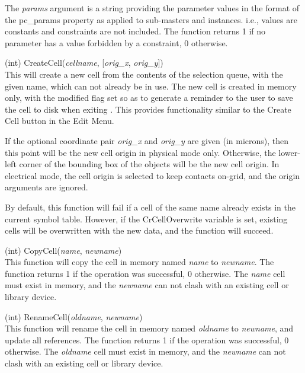 \begin{description}
The {\it params} argument is a string providing the parameter values
in the format of the {\et pc\_params} property as applied to
sub-masters and instances.  i.e., values are constants and constraints
are not included.  The function returns 1 if no parameter has a value
forbidden by a constraint, 0 otherwise.

\item{(int) \vt CreateCell({\it cellname\/}, [{\it orig\_x\/},
  {\it orig\_y\/}])}\\
This will create a new cell from the contents of the selection
queue, with the given name, which can not already be in use.  The new
cell is created in memory only, with the modified flag set so as to
generate a reminder to the user to save the cell to disk when exiting
{\Xic}.  This provides functionality similar to the {\cb Create Cell}
button in the {\cb Edit Menu}.

If the optional coordinate pair {\it orig\_x} and {\it orig\_y} are
given (in microns), then this point will be the new cell origin in
physical mode only.  Otherwise, the lower-left corner of the bounding
box of the objects will be the new cell origin.  In electrical mode,
the cell origin is selected to keep contacts on-grid, and the origin
arguments are ignored.

By default, this function will fail if a cell of the same name already
exists in the current symbol table.  However, if the {\et
CrCellOverwrite} variable is set, existing cells will be overwritten
with the new data, and the function will succeed.

\item{(int) \vt CopyCell({\it name\/}, {\it newname\/})}\\
This function will copy the cell in memory named {\it name} to {\it
newname}.  The function returns 1 if the operation was successful, 0
otherwise.  The {\it name} cell must exist in memory, and the {\it
newname} can not clash with an existing cell or library device.

\item{(int) \vt RenameCell({\it oldname\/}, {\it newname\/})}\\
This function will rename the cell in memory named {\it oldname} to
{\it newname\/}, and update all references.  The function returns 1 if
the operation was successful, 0 otherwise.  The {\it oldname} cell
must exist in memory, and the {\it newname} can not clash with an
existing cell or library device.


\end{description}
